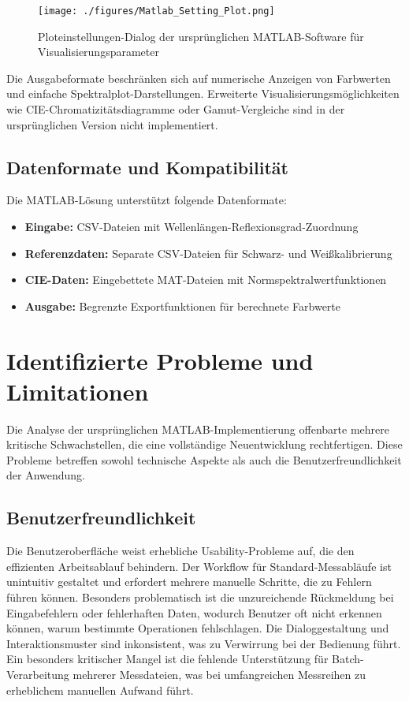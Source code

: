 \begin{figure}[hbpt]
    	\centering
    	\texttt{[image: ./figures/Matlab\_Setting\_Plot.png]}
    	\caption{Ploteinstellungen-Dialog der ursprünglichen MATLAB-Software für Visualisierungsparameter}
    	\label{fig:Matlab_Setting_Plot}
    \end{figure}
    
Die Ausgabeformate beschränken sich auf numerische Anzeigen von Farbwerten und einfache Spektralplot-Darstellungen. Erweiterte Visualisierungsmöglichkeiten wie CIE-Chromatizitätsdiagramme oder Gamut-Vergleiche sind in der ursprünglichen Version nicht implementiert.

\subsection{Datenformate und Kompatibilität}

Die MATLAB-Lösung unterstützt folgende Datenformate:

\begin{itemize}
    \item \textbf{Eingabe:} CSV-Dateien mit Wellenlängen-Reflexionsgrad-Zuordnung
    \item \textbf{Referenzdaten:} Separate CSV-Dateien für Schwarz- und Weißkalibrierung
    \item \textbf{CIE-Daten:} Eingebettete MAT-Dateien mit Normspektralwertfunktionen
    \item \textbf{Ausgabe:} Begrenzte Exportfunktionen für berechnete Farbwerte
\end{itemize}

\section{Identifizierte Probleme und Limitationen}

Die Analyse der ursprünglichen MATLAB-Implementierung offenbarte mehrere kritische Schwachstellen, die eine vollständige Neuentwicklung rechtfertigen. Diese Probleme betreffen sowohl technische Aspekte als auch die Benutzerfreundlichkeit der Anwendung.

\subsection{Benutzerfreundlichkeit}

Die Benutzeroberfläche weist erhebliche Usability-Probleme auf, die den effizienten Arbeitsablauf behindern. Der Workflow für Standard-Messabläufe ist unintuitiv gestaltet und erfordert mehrere manuelle Schritte, die zu Fehlern führen können. Besonders problematisch ist die unzureichende Rückmeldung bei Eingabefehlern oder fehlerhaften Daten, wodurch Benutzer oft nicht erkennen können, warum bestimmte Operationen fehlschlagen. Die Dialoggestaltung und Interaktionsmuster sind inkonsistent, was zu Verwirrung bei der Bedienung führt. Ein besonders kritischer Mangel ist die fehlende Unterstützung für Batch-Verarbeitung mehrerer Messdateien, was bei umfangreichen Messreihen zu erheblichem manuellen Aufwand führt.

